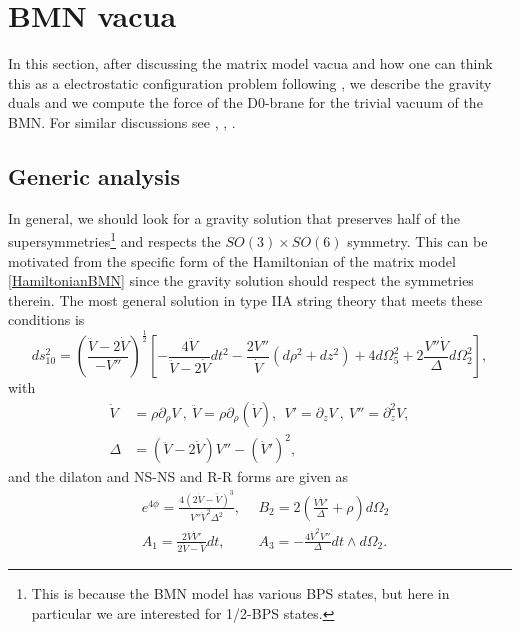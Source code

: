 \documentclass[11pt,english]{article}
\newcommand{\be}{\begin{equation}}
\newcommand{\ee}{\end{equation}}
\newcommand{\p}{\partial}
\numberwithin{equation}{section}
\begin{document}
\section{BMN vacua}\label{Vacua}
In this section, after discussing the matrix model vacua and how one can think this as a electrostatic configuration problem following \cite{Lin2006}, we describe the gravity duals and we compute the force of the D0-brane for the trivial vacuum of the BMN.  For similar discussions see \cite{Lozano2017}, \cite{Lin2004a}, \cite{Costa2015}.
\subsection{Generic analysis}
In general, we should look for a gravity solution that preserves half of the supersymmetries\footnote{This is because the BMN model has various BPS states, but here in particular we are interested for 1/2-BPS states.} and respects the $SO(3)\times SO(6)$ symmetry. This can be motivated from the specific form of the Hamiltonian of the matrix model \eqref{HamiltonianBMN} since the gravity solution should respect the symmetries therein.  The most general solution in type IIA string theory that meets these conditions is \cite{Lin2006}
\be \label{IIAmetric}
ds^2_{10}=\left(\frac{\ddot{V}-2\dot{V}}{-V''}\right)^\frac{1}{2}\left[-\frac{4\ddot{V}}{\ddot{V}-2\dot{V}}dt^2-\frac{2V''}{\dot{V}}\left(d\rho^2+dz^2\right)+4d\Omega_5^2+2\frac{V''\dot{V}}{\Delta}d\Omega_2^2\right],
\ee 
with
\begin{align*}
\dot{V}&=\rho\p_{\rho} V~,~\ddot{V}=\rho\p_{\rho}(\dot{V}),~
~V'=\p_{z}V~,~V''=\p^2_zV,\\
\Delta&=\left(\ddot{V}-2\dot{V}\right)V''-\left(\dot{V}'\right)^2,
\end{align*}
and the dilaton and NS-NS and R-R forms are given as 
\begin{eqnarray}
&e^{4\phi}=\frac{4(2\dot{V}-\ddot{V})^3}{V''\dot{V}^2\Delta^2},~~&B_{2}=2\left(\frac{\dot{V}\dot{V}'}{\Delta}+\rho\right)d\Omega_2\nonumber\\
&A_1=\frac{2\dot{V}\dot{V}'}{2\dot{V}-\ddot{V}}dt,~~&A_3=-\frac{4\dot{V}^2V''}{\Delta}dt\wedge d\Omega_2.
\end{eqnarray}
\end{document}
